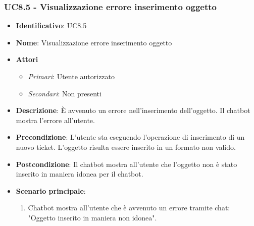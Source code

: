 \subsubsection{UC8.5 - Visualizzazione errore inserimento oggetto}
\begin{itemize}
	\item \textbf{Identificativo}: UC8.5
	\item \textbf{Nome}: Visualizzazione errore inserimento oggetto 
	\item \textbf{Attori}
	\begin{itemize} 
		\item \textit{Primari}: Utente autorizzato
		\item \textit{Secondari}: Non presenti
	\end{itemize}
	\item \textbf{Descrizione}: È avvenuto un errore nell'inserimento dell'oggetto. Il chatbot mostra l'errore all'utente.
	\item \textbf{Precondizione}: L'utente sta eseguendo l'operazione di inserimento di un nuovo ticket. L'oggetto risulta essere inserito in un formato non valido. 
	\item \textbf{Postcondizione}: Il chatbot mostra all'utente che l'oggetto non è stato inserito in maniera idonea per il chatbot.
	\item \textbf{Scenario principale}: \begin{enumerate}
		\item Chatbot mostra all'utente che è avvenuto un errore tramite chat: "Oggetto inserito in maniera non idonea".
		\end{enumerate}
\end{itemize}
